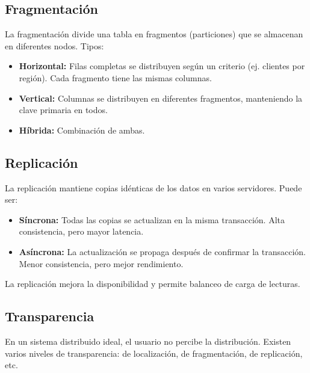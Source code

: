 \documentclass[12pt,a4paper,openany,oneside]{book}
\begin{document}
\subsection{Fragmentación}
La fragmentación divide una tabla en fragmentos (particiones) que se almacenan en diferentes nodos. Tipos:
\begin{itemize}
    \item \textbf{Horizontal:} Filas completas se distribuyen según un criterio (ej. clientes por región). Cada fragmento tiene las mismas columnas.
    \item \textbf{Vertical:} Columnas se distribuyen en diferentes fragmentos, manteniendo la clave primaria en todos.
    \item \textbf{Híbrida:} Combinación de ambas.
\end{itemize}

\begin{center}
\end{center}

\subsection{Replicación}
La replicación mantiene copias idénticas de los datos en varios servidores. Puede ser:
\begin{itemize}
    \item \textbf{Síncrona:} Todas las copias se actualizan en la misma transacción. Alta consistencia, pero mayor latencia.
    \item \textbf{Asíncrona:} La actualización se propaga después de confirmar la transacción. Menor consistencia, pero mejor rendimiento.
\end{itemize}
La replicación mejora la disponibilidad y permite balanceo de carga de lecturas.

\subsection{Transparencia}
En un sistema distribuido ideal, el usuario no percibe la distribución. Existen varios niveles de transparencia: de localización, de fragmentación, de replicación, etc.
\end{document}
